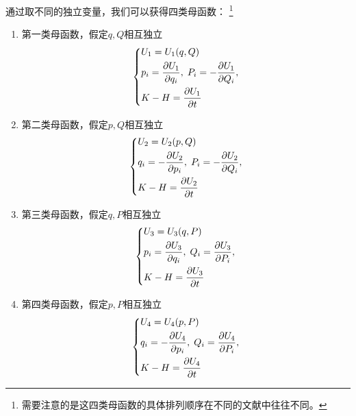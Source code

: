 \documentclass[UTF8, a4paper]{ctexart}
\begin{document}
通过取不同的独立变量，我们可以获得四类母函数：%
\footnote{需要注意的是这四类母函数的具体排列顺序在不同的文献中往往不同。}
\begin{enumerate}
    \item 第一类母函数，假定$q, Q$相互独立
    \begin{equation}
        \left\{
            \begin{aligned}
                &U_1 = U_1(q, Q) \\
                &p_i = \pdv{U_1}{q_i}, \; P_i = -\pdv{U_1}{Q_i}, \\
                &K - H = \pdv{U_1}{t}
            \end{aligned}
        \right.
    \end{equation}
    \item 第二类母函数，假定$p, Q$相互独立
    \begin{equation}
        \left\{
            \begin{aligned}
                &U_2 = U_2(p, Q) \\
                &q_i = - \pdv{U_2}{p_i}, \; P_i = - \pdv{U_2}{Q_i}, \\
                &K - H = \pdv{U_2}{t}
            \end{aligned}
        \right.
    \end{equation}
    \item 第三类母函数，假定$q, P$相互独立
    \begin{equation}
        \left\{
            \begin{aligned}
                &U_3 = U_3(q, P) \\
                &p_i = \pdv{U_3}{q_i}, \; Q_i = \pdv{U_3}{P_i}, \\
                &K - H = \pdv{U_3}{t}
            \end{aligned}
        \right.
        \label{eq:3-class-generating}
    \end{equation}
    \item 第四类母函数，假定$p, P$相互独立
    \begin{equation}
        \left\{
            \begin{aligned}
                &U_4 = U_4(p, P) \\
                &q_i = - \pdv{U_4}{p_i}, \; Q_i = \pdv{U_4}{P_i}, \\
                &K - H = \pdv{U_4}{t}
            \end{aligned}
        \right.
    \end{equation}
\end{enumerate}
\end{document}
